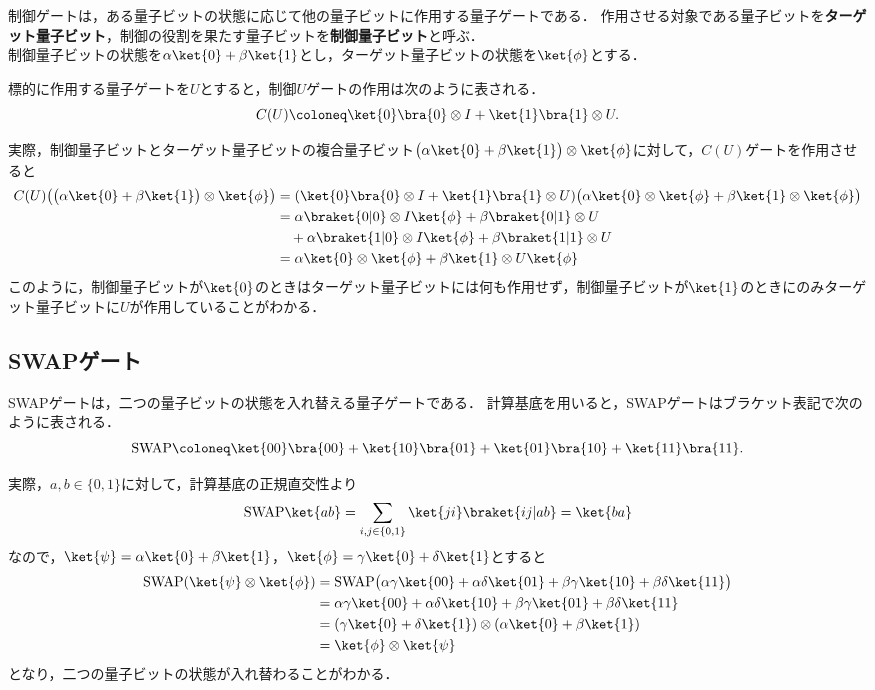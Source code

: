 制御ゲートは，ある量子ビットの状態に応じて他の量子ビットに作用する量子ゲートである．
作用させる対象である量子ビットを\textbf{ターゲット量子ビット}，制御の役割を果たす量子ビットを\textbf{制御量子ビット}と呼ぶ．\\
制御量子ビットの状態を$\alpha\ket{0}+\beta\ket{1}$とし，ターゲット量子ビットの状態を$\ket{\phi}$とする．
\begin{defi}[制御$U$ゲート]
標的に作用する量子ゲートを$U$とすると，制御$U$ゲートの作用は次のように表される．
\begin{equation*}
  C(U) \coloneq \ket{0}\bra{0}\otimes I + \ket{1}\bra{1}\otimes U.
\end{equation*}
\end{defi}
実際，制御量子ビットとターゲット量子ビットの複合量子ビット$\big(\alpha\ket{0}+\beta\ket{1}\big)\otimes\ket{\phi}$に対して，$C(U)$ゲートを作用させると
\begin{align*}
  C(U)\big(\big(\alpha\ket{0}+\beta\ket{1}\big)\otimes\ket{\phi}\big)
   & = (\ket{0}\bra{0}\otimes I + \ket{1}\bra{1}\otimes U)\big(\alpha\ket{0}\otimes\ket{\phi} + \beta\ket{1}\otimes\ket{\phi}\big) \\
   & = \alpha\braket{0|0}\otimes I\ket{\phi} + \beta\braket{0|1}\otimes U                                                          \\
   & \quad + \alpha\braket{1|0}\otimes I\ket{\phi} + \beta\braket{1|1}\otimes U                                                    \\
   & = \alpha\ket{0}\otimes\ket{\phi} + \beta\ket{1}\otimes U\ket{\phi}
\end{align*}
このように，制御量子ビットが$\ket{0}$のときはターゲット量子ビットには何も作用せず，制御量子ビットが$\ket{1}$のときにのみターゲット量子ビットに$U$が作用していることがわかる．

\subsection{SWAPゲート}
\begin{defi}[SWAPゲート]
SWAPゲートは，二つの量子ビットの状態を入れ替える量子ゲートである． 計算基底を用いると，SWAPゲートはブラケット表記で次のように表される．
\[
  \text{SWAP}
  \coloneq \ket{00}\bra{00}+\ket{10}\bra{01}
  +\ket{01}\bra{10}+\ket{11}\bra{11}.
\]
\end{defi}
実際，$a,b\in\{0,1\}$に対して，計算基底の正規直交性より
\[
  \text{SWAP}\ket{ab}
  =\sum_{i,j\in\{0,1\}}\ket{ji}\braket{ij|ab}
  =\ket{ba}
\]
なので，$\ket{\psi}=\alpha\ket{0}+\beta\ket{1}$，$\ket{\phi}=\gamma\ket{0}+\delta\ket{1}$とすると
\begin{align*}
  \text{SWAP}(\ket{\psi}\otimes\ket{\phi})
   & =\text{SWAP}\bigl(\alpha\gamma\ket{00}+\alpha\delta\ket{01}
  +\beta\gamma\ket{10}+\beta\delta\ket{11}\bigr)                       \\
   & =\alpha\gamma\ket{00}+\alpha\delta\ket{10}
  +\beta\gamma\ket{01}+\beta\delta\ket{11}                             \\
   & =(\gamma\ket{0}+\delta\ket{1})\otimes(\alpha\ket{0}+\beta\ket{1}) \\
   & =\ket{\phi}\otimes\ket{\psi}
\end{align*}
となり，二つの量子ビットの状態が入れ替わることがわかる．

